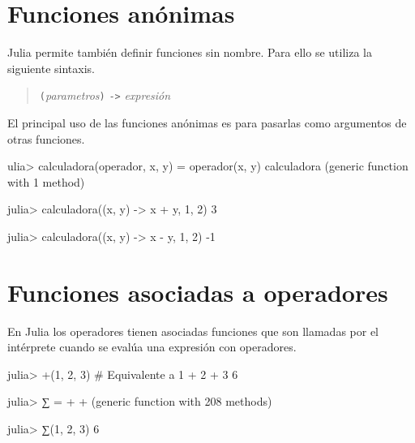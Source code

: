 \documentclass[
  letterpaper,
  DIV=11,
  numbers=noendperiod]{scrreprt}
\newenvironment{Shaded}{\begin{snugshade}}{\end{snugshade}}
\newcommand{\CommentTok}[1]{\textcolor[rgb]{0.37,0.37,0.37}{#1}}
\newcommand{\FloatTok}[1]{\textcolor[rgb]{0.68,0.00,0.00}{#1}}
\newcommand{\FunctionTok}[1]{\textcolor[rgb]{0.28,0.35,0.67}{#1}}
\newcommand{\KeywordTok}[1]{\textcolor[rgb]{0.00,0.23,0.31}{#1}}
\newcommand{\NormalTok}[1]{\textcolor[rgb]{0.00,0.23,0.31}{#1}}
\newcommand{\OperatorTok}[1]{\textcolor[rgb]{0.37,0.37,0.37}{#1}}
\begin{document}
\hypertarget{funciones-anuxf3nimas}{%
\section{Funciones anónimas}\label{funciones-anuxf3nimas}}

Julia permite también definir funciones sin nombre. Para ello se utiliza
la siguiente sintaxis.

\begin{quote}
\texttt{(}\emph{parametros}\texttt{)} \texttt{-\textgreater{}}
\emph{expresión}
\end{quote}

El principal uso de las funciones anónimas es para pasarlas como
argumentos de otras funciones.

\begin{Shaded}
\begin{Highlighting}[]
\NormalTok{ulia}\OperatorTok{\textgreater{}} \FunctionTok{calculadora}\NormalTok{(operador, x, y) }\OperatorTok{=} \FunctionTok{operador}\NormalTok{(x, y) }
\NormalTok{calculadora (generic }\KeywordTok{function}\NormalTok{ with }\FloatTok{1}\NormalTok{ method)}

\NormalTok{julia}\OperatorTok{\textgreater{}} \FunctionTok{calculadora}\NormalTok{((x, y) }\OperatorTok{{-}\textgreater{}}\NormalTok{ x }\OperatorTok{+}\NormalTok{ y, }\FloatTok{1}\NormalTok{, }\FloatTok{2}\NormalTok{)}
\FloatTok{3}

\NormalTok{julia}\OperatorTok{\textgreater{}} \FunctionTok{calculadora}\NormalTok{((x, y) }\OperatorTok{{-}\textgreater{}}\NormalTok{ x }\OperatorTok{{-}}\NormalTok{ y, }\FloatTok{1}\NormalTok{, }\FloatTok{2}\NormalTok{)}
\OperatorTok{{-}}\FloatTok{1}
\end{Highlighting}
\end{Shaded}

\hypertarget{funciones-asociadas-a-operadores}{%
\section{Funciones asociadas a
operadores}\label{funciones-asociadas-a-operadores}}

En Julia los operadores tienen asociadas funciones que son llamadas por
el intérprete cuando se evalúa una expresión con operadores.

\begin{Shaded}
\begin{Highlighting}[]
\NormalTok{julia}\OperatorTok{\textgreater{}} \FunctionTok{+}\NormalTok{(}\FloatTok{1}\NormalTok{, }\FloatTok{2}\NormalTok{, }\FloatTok{3}\NormalTok{)  }\CommentTok{\# Equivalente a 1 + 2 + 3}
\FloatTok{6}

\NormalTok{julia}\OperatorTok{\textgreater{}}\NormalTok{ ∑ }\OperatorTok{=} \OperatorTok{+}
\OperatorTok{+}\NormalTok{ (generic }\KeywordTok{function}\NormalTok{ with }\FloatTok{208}\NormalTok{ methods)}

\NormalTok{julia}\OperatorTok{\textgreater{}} \FunctionTok{∑}\NormalTok{(}\FloatTok{1}\NormalTok{, }\FloatTok{2}\NormalTok{, }\FloatTok{3}\NormalTok{)}
\FloatTok{6}
\end{Highlighting}
\end{Shaded}
\end{document}

